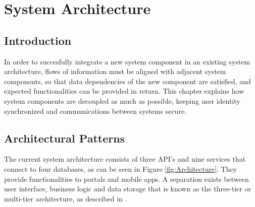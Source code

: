 \graphicspath{{Chapter3/Figs/Vector/}{Chapter3/Figs/}}

%
\chapter{System Architecture}
\section{Introduction}
In order to succesfully integrate a new system component in an existing system architecture, flows of information must be aligned with adjacent system components, so that data dependencies of the new component are satisfied, and expected functionalities can be provided in return. This chapter explains how system components are decoupled as much as possible, keeping user identity synchronized and communications between systems secure.

%
\section{Architectural Patterns}
The current system architecture consists of three API's and nine services that connect to four databases, as can be seen in Figure \ref{fig:Architecture}. They provide functionalities to portals and mobile apps. A separation exists between user interface, business logic and data storage that is known as the three-tier or multi-tier architecture, as described in \cite{IBM-3-tier}.

